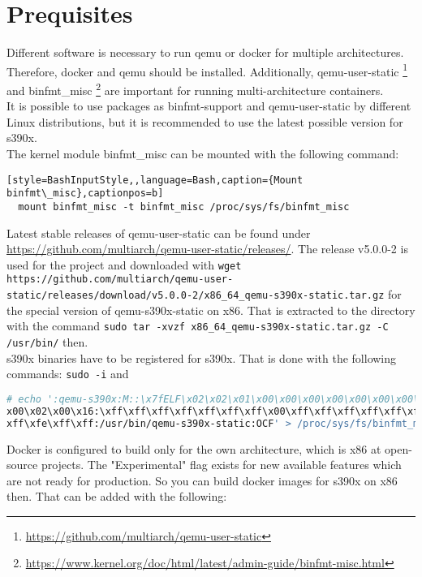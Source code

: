 \chapter{Prequisites}\label{ch:prequisites}


Different software is necessary to run qemu or docker for multiple architectures. Therefore, docker and qemu should be installed. Additionally, qemu-user-static \footnote{\url{https://github.com/multiarch/qemu-user-static}} and binfmt\_misc \footnote{\url{https://www.kernel.org/doc/html/latest/admin-guide/binfmt-misc.html}} are important for running multi-architecture containers. \\

It is possible to use packages as binfmt-support and qemu-user-static by different Linux distributions, but it is recommended to use the latest possible version for s390x. \\

The kernel module binfmt\_misc can be mounted with the following command: 
\begin{lstlisting}[style=BashInputStyle,,language=Bash,caption={Mount binfmt\_misc},captionpos=b]
  mount binfmt_misc -t binfmt_misc /proc/sys/fs/binfmt_misc
\end{lstlisting}

Latest stable releases of qemu-user-static can be found under \url{https://github.com/multiarch/qemu-user-static/releases/}. The release v5.0.0-2 is used for the project and downloaded with \lstinline!wget https://github.com/multiarch/qemu-user-static/releases/download/v5.0.0-2/x86_64_qemu-s390x-static.tar.gz! for the special version of qemu-s390x-static on x86. That is extracted to the directory  with the command \lstinline!sudo tar -xvzf x86_64_qemu-s390x-static.tar.gz -C /usr/bin/! then. \\

s390x binaries have to be registered for s390x. That is done with the following commands: \lstinline!sudo -i! and \begin{lstlisting}[style=BashInputStyle,language=Bash, numberstyle=\myHexNumber, caption={Register s390x binaries},captionpos=b]
# echo ':qemu-s390x:M::\x7fELF\x02\x02\x01\x00\x00\x00\x00\x00\x00\x00\x00\x00\ 
x00\x02\x00\x16:\xff\xff\xff\xff\xff\xff\xff\x00\xff\xff\xff\xff\xff\xff\xff\xff\
xff\xfe\xff\xff:/usr/bin/qemu-s390x-static:OCF' > /proc/sys/fs/binfmt_misc/register
\end{lstlisting}

Docker is configured to build only for the own architecture, which is x86 at open-source projects. The "Experimental" flag exists for new available features which are not ready for production. So you can build docker images for s390x on x86 then. That can be added with the following:

